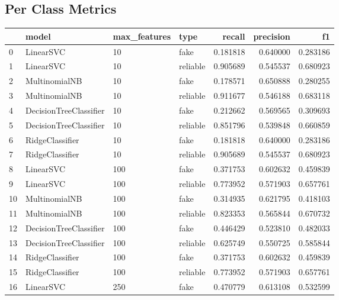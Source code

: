 \subsection{Per Class Metrics}
\begin{longtable}{llllrrr}
\toprule
{} &                   model & max\_features &      type &    recall &  precision &        f1 \\
\midrule
0  &               LinearSVC &           10 &      fake &  0.181818 &   0.640000 &  0.283186 \\
1  &               LinearSVC &           10 &  reliable &  0.905689 &   0.545537 &  0.680923 \\
2  &           MultinomialNB &           10 &      fake &  0.178571 &   0.650888 &  0.280255 \\
3  &           MultinomialNB &           10 &  reliable &  0.911677 &   0.546188 &  0.683118 \\
4  &  DecisionTreeClassifier &           10 &      fake &  0.212662 &   0.569565 &  0.309693 \\
5  &  DecisionTreeClassifier &           10 &  reliable &  0.851796 &   0.539848 &  0.660859 \\
6  &         RidgeClassifier &           10 &      fake &  0.181818 &   0.640000 &  0.283186 \\
7  &         RidgeClassifier &           10 &  reliable &  0.905689 &   0.545537 &  0.680923 \\
8  &               LinearSVC &          100 &      fake &  0.371753 &   0.602632 &  0.459839 \\
9  &               LinearSVC &          100 &  reliable &  0.773952 &   0.571903 &  0.657761 \\
10 &           MultinomialNB &          100 &      fake &  0.314935 &   0.621795 &  0.418103 \\
11 &           MultinomialNB &          100 &  reliable &  0.823353 &   0.565844 &  0.670732 \\
12 &  DecisionTreeClassifier &          100 &      fake &  0.446429 &   0.523810 &  0.482033 \\
13 &  DecisionTreeClassifier &          100 &  reliable &  0.625749 &   0.550725 &  0.585844 \\
14 &         RidgeClassifier &          100 &      fake &  0.371753 &   0.602632 &  0.459839 \\
15 &         RidgeClassifier &          100 &  reliable &  0.773952 &   0.571903 &  0.657761 \\
16 &               LinearSVC &          250 &      fake &  0.470779 &   0.613108 &  0.532599 \\

\end{longtable}
